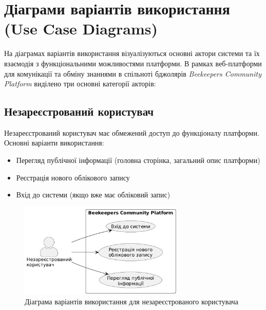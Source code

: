 \section{Діаграми варіантів використання (Use Case Diagrams)}
\label{sec:use_cases}

На діаграмах варіантів використання візуалізуються основні актори системи та їх взаємодія з функціональними можливостями платформи. В рамках веб-платформи для комунікації та обміну знаннями в спільноті бджолярів \textit{Beekeepers Community Platform} виділено три основні категорії акторів:

\subsection{Незареєстрований користувач}
Незареєстрований користувач має обмежений доступ до функціоналу платформи. Основні варіанти використання:
\begin{itemize}
    \item Перегляд публічної інформації (головна сторінка, загальний опис платформи)
    \item Реєстрація нового облікового запису
    \item Вхід до системи (якщо вже має обліковий запис)
\end{itemize}

\begin{figure}[htbp]
  \centering
  \includegraphics[width=0.7\textwidth]{practice_report/images/usecase_guest.png}
  \caption{Діаграма варіантів використання для незареєстрованого користувача}
  \label{fig:usecase_guest}
\end{figure}

